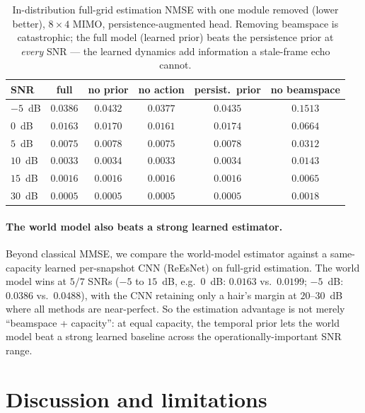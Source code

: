 \documentclass[11pt]{article}
\begin{document}
\begin{table}[h]
\centering
\begin{tabular}{lccccc}
\toprule
SNR & \textbf{full} & no prior & no action & persist.\ prior & no beamspace \\
\midrule
$-5$~dB & $\mathbf{0.0386}$ & $0.0432$ & $0.0377$ & $0.0435$ & $0.1513$ \\
$0$~dB  & $\mathbf{0.0163}$ & $0.0170$ & $0.0161$ & $0.0174$ & $0.0664$ \\
$5$~dB  & $\mathbf{0.0075}$ & $0.0078$ & $0.0075$ & $0.0078$ & $0.0312$ \\
$10$~dB & $\mathbf{0.0033}$ & $0.0034$ & $0.0033$ & $0.0034$ & $0.0143$ \\
$15$~dB & $\mathbf{0.0016}$ & $0.0016$ & $0.0016$ & $0.0016$ & $0.0065$ \\
$30$~dB & $\mathbf{0.0005}$ & $0.0005$ & $0.0005$ & $0.0005$ & $0.0018$ \\
\bottomrule
\end{tabular}
\caption{In-distribution full-grid estimation NMSE with one module removed (lower better), $8\times4$
MIMO, persistence-augmented head. Removing beamspace is catastrophic; the full model (learned prior)
beats the persistence prior at \emph{every} SNR --- the learned dynamics add information a stale-frame
echo cannot.}
\label{tab:ablation}
\end{table}

\paragraph{The world model also beats a strong learned estimator.} Beyond classical MMSE, we compare
the world-model estimator against a same-capacity learned per-snapshot CNN (ReEsNet) on full-grid
estimation. The world model wins at $5/7$ SNRs ($-5$ to $15$~dB, e.g.\ $0$~dB: $0.0163$ vs.\ $0.0199$;
$-5$~dB: $0.0386$ vs.\ $0.0488$), with the CNN retaining only a hair's margin at $20$--$30$~dB where
all methods are near-perfect. So the estimation advantage is not merely ``beamspace + capacity'': at
equal capacity, the temporal prior lets the world model beat a strong learned baseline across the
operationally-important SNR range.

\section{Discussion and limitations}\label{sec:limits}
\end{document}
